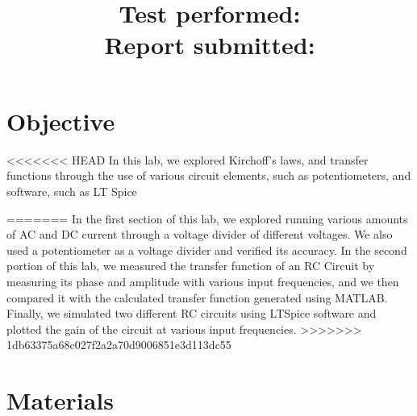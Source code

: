 \documentclass[10pt]{article}
\title{
    \textbf{\courseTitle} \\
    \textbf{\documentTitle} \\
    \bigskip
    \textbf{\large{Test performed: \testDate}} \\
    \textbf{\large{Report submitted: \reportDate}} \\
    \bigskip
    \bigskip
}
\author{\documentAuthor}
\date{}
\begin{document}
\maketitle

\newpage

\section{Objective}

<<<<<<< HEAD
In this lab, we explored Kirchoff's laws, and transfer functions through the use of various circuit elements, such as potentiometers, and software, such as LT Spice

\medskip
=======
In the first section of this lab, we explored running various amounts of AC and DC current through a voltage divider of different voltages. We also used a potentiometer as a voltage divider and verified its accuracy. In the second portion of this lab, we measured the transfer function of an RC Circuit by measuring its phase and amplitude with various input frequencies, and we then compared it with the calculated transfer function generated using MATLAB. Finally, we simulated two different RC circuits using LTSpice software and plotted the gain of the circuit at various input frequencies. 
>>>>>>> 1db63375a68c027f2a2a70d9006851e3d113dc55



\section{Materials}
\end{document}

